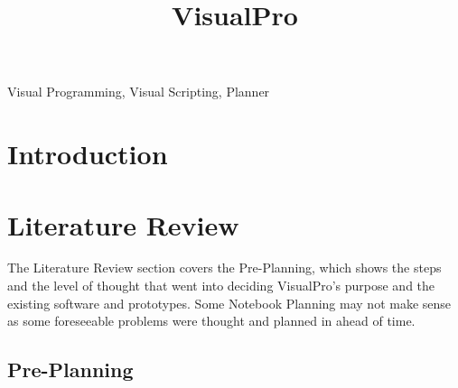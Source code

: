 \documentclass[conference]{IEEEtran}
\begin{document}
	\title{VisualPro}

	\author{
	}

     \maketitle
    
    \thispagestyle{plain}
    \pagestyle{plain}
    
    \tableofcontents
    \newpage
    \begin{abstract}
    
    \end{abstract}

    \begin{IEEEkeywords}
        Visual Programming, Visual Scripting, Planner
    \end{IEEEkeywords}

    \section{Introduction}

    \section{Literature Review}
      The Literature Review section covers the Pre-Planning, which shows the steps and the level of thought that went into deciding VisualPro's purpose and the existing software and prototypes. Some Notebook Planning may not make sense as some foreseeable problems were thought and planned in ahead of time.

      \subsection{Pre-Planning}
\end{document}
